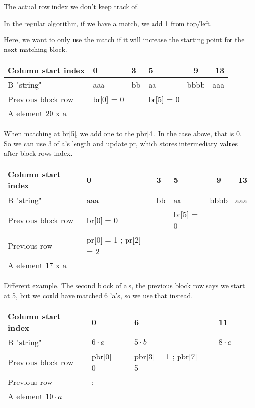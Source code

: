 \documentclass{article}
\begin{document}
\vspace{5mm}
The actual row index we don't keep track of.  
\vspace{5mm}




In the regular algorithm, if we have a match, we add 1 from top/left.

Here, we want to only use the match if it will increase the starting point for the
next matching block.

\vspace{5mm}

\begin{tabular}{ l || l | l | l | c | r }
\hline 
Column start index & 0 & 3 & 5 & 9 & 13 \\
\hline
B "string" & aaa & bb & aa & bbbb & aaa \\
\hline
Previous block row & br[0] = 0 & & br[5] = 0 \\
\hline
A element 20 x a \\
\end{tabular}


\vspace{5mm}

When matching at br[5], we add one to the pbr[4].  In the case above, that is
0.  So we can use 3 of a's length and update pr, which stores intermediary values after block rows index.

\vspace{5mm}

\begin{tabular}{ l || l | l | l | c | r }
\hline 
Column start index & 0 & 3 & 5 & 9 & 13 \\
\hline
B "string" & aaa & bb & aa & bbbb & aaa \\
\hline
Previous block row & br[0] = 0 & & br[5] = 0 \\
\hline
Previous row & pr[0] = 1 ; pr[2] = 2 & &  \\
\hline
A element 17 x a \\
\end{tabular}


\vspace{15mm}

Different example. The second block of a's, the previous block row
says we start at 5, but we could have matched 6 'a's, so we use that 
instead.

\vspace{5mm}

\begin{tabular}{ l || l | l | l | c | r }
\hline 
Column start index & 0 & 6 & 11 &  &  \\
\hline
B "string" & $6 \cdotp a$  & $5 \cdotp b$  & $8 \cdotp a$ &  &  \\
\hline
Previous block row & pbr[0] = 0 & pbr[3] = 1 ; pbr[7] = 5 &  \\
\hline
Previous row & ;  & &  \\
\hline
A element $10 \cdotp a$ \\
\end{tabular}
\end{document}
